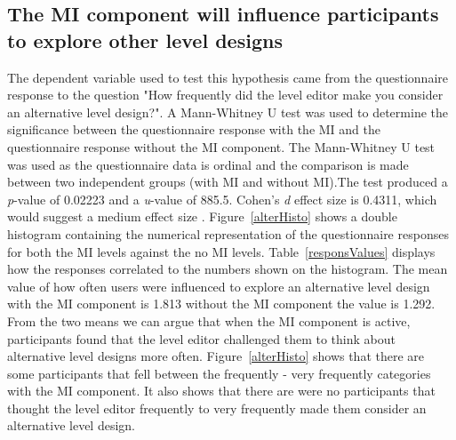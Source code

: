 \documentclass[journal]{IEEEtran}
\begin{document}
\subsection{The MI component will influence participants to explore other level designs}\label{alter}
The dependent variable used to test this hypothesis came from the questionnaire response to the question "How frequently did the level editor make you consider an alternative level design?". A Mann-Whitney U \cite{mann1947test} test was used to determine the significance between the questionnaire response with the MI and the questionnaire response without the MI component. The Mann-Whitney U test was used as the questionnaire data is ordinal and the comparison is made between two independent groups (with MI and without MI).The test produced a \textit{p}-value of 0.02223 and a \textit{u}-value of 885.5. Cohen's \textit{d} effect size is 0.4311, which would suggest a medium effect size \cite{cohen1988statistical}. Figure~\ref{alterHisto} shows a double histogram containing the numerical representation of the questionnaire responses for both the MI levels against the no MI levels. Table~\ref{responsValues} displays how the responses correlated to the numbers shown on the histogram. The mean value of how often users were influenced to explore an alternative level design with the MI component is 1.813 without the MI component the value is 1.292. From the two means we can argue that when the MI component is active, participants found that the level editor challenged them to think about alternative level designs more often. Figure~\ref{alterHisto} shows that there are some participants that fell between the frequently - very frequently categories with the MI component. It also shows that there are were no participants that thought the level editor frequently to very frequently made them consider an alternative level design.  
\end{document}
